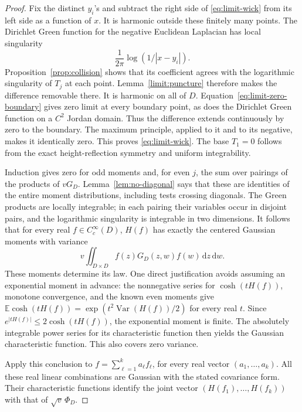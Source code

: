 \documentclass[11pt]{article}
\theoremstyle{definition}
\theoremstyle{remark}
\numberwithin{equation}{section}
\begin{document}
\begin{proof}
Fix the distinct \(y_i\)'s and subtract the right side of
\eqref{eq:limit-wick} from its left side as a function of \(x\).
It is harmonic outside these finitely many points.
The Dirichlet Green function for the negative Euclidean Laplacian
has local singularity
\[
             \frac1{2\pi}\log(1/|x-y_i|).
\]
Proposition~\ref{prop:collision} shows that its coefficient agrees
with the logarithmic singularity of \(T_j\) at each point.
Lemma~\ref{limit:puncture} therefore makes the difference removable
there.  It is harmonic on all of \(D\).
Equation~\eqref{eq:limit-zero-boundary} gives zero limit at every
boundary point, as does the Dirichlet Green function on a \(C^2\)
Jordan domain.  Thus the difference extends continuously by zero
to the boundary.  The maximum principle, applied to it and to its
negative, makes it identically zero.  This proves
\eqref{eq:limit-wick}.  The base \(T_1=0\) follows from the exact
height-reflection symmetry and uniform integrability.

Induction gives zero for odd moments and, for even \(j\), the sum
over pairings of the products of \(vG_D\).
Lemma~\ref{lem:no-diagonal} says that these are identities of the
entire moment distributions, including tests crossing diagonals.
The Green products are locally integrable; in each pairing their
variables occur in disjoint pairs, and the logarithmic singularity
is integrable in two dimensions.
It follows that for every real \(f\in C_c^\infty(D)\), \(H(f)\)
has exactly the centered Gaussian moments with variance
\[
       v\iint_{D\times D}f(z)G_D(z,w)f(w)\,\mathrm d z\,\mathrm d w.
\]
These moments determine its law.  One direct justification avoids
assuming an exponential moment in advance: the nonnegative series
for \(\cosh(tH(f))\), monotone convergence, and the known even
moments give
\(\mathbb E\cosh(tH(f))=\exp(t^2\operatorname{Var}(H(f))/2)\) for every real \(t\).
Since \(e^{|tH(f)|}\le2\cosh(tH(f))\), the exponential moment is
finite.  The absolutely integrable power series for its
characteristic function then yields the Gaussian characteristic
function.  This also covers zero variance.

Apply this conclusion to
\(f=\sum_{\ell=1}^k a_\ell f_\ell\), for every real vector
\((a_1,\ldots,a_k)\).  All these real linear combinations are
Gaussian with the stated covariance form.  Their characteristic
functions identify the joint vector
\((H(f_1),\ldots,H(f_k))\) with that of
\(\sqrt v\,\Phi_D\).


\end{proof}
\end{document}
